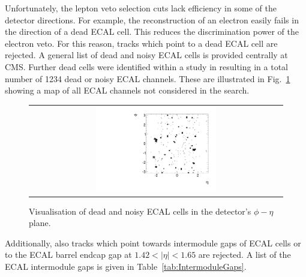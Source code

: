 Unfortunately, the lepton veto selection cuts lack efficiency in some of the detector directions.
For example, the reconstruction of an electron easily fails in the direction of a dead ECAL cell.
This reduces the discrimination power of the electron veto.
For this reason, tracks which point to a dead ECAL cell are rejected.
A general list of dead and noisy ECAL cells is provided centrally at CMS.
Further dead cells were identified within a study in \cite{bib:CMS:DT_8TeV} resulting in a total number of 1234 dead or noisy ECAL channels. 
These are illustrated in Fig.~\ref{fig:DeadECALmap} showing a map of all ECAL channels not considered in the search.
\begin{figure}[!t]
  \centering 
  \begin{tabular}{c}
    \includegraphics[width=0.49\textwidth]{figures/analysis/DeadECALMap.pdf}
  \end{tabular}
  \caption{Visualisation of dead and noisy ECAL cells in the detector's $\phi - \eta$ plane.}
  \label{fig:DeadECALmap}
\end{figure}

Additionally, also tracks which point towards intermodule gaps of ECAL cells or to the ECAL barrel endcap gap at $1.42<|\eta|<1.65$ are rejected.
A list of the ECAL intermodule gaps is given in Table~\ref{tab:IntermoduleGaps}.
\renewcommand{\arraystretch}{1.5}
\begin{table}[!hbt]
\centering
\caption{Intermodule ECAL gaps.}
\label{tab:IntermoduleGaps}
\end{table}  

